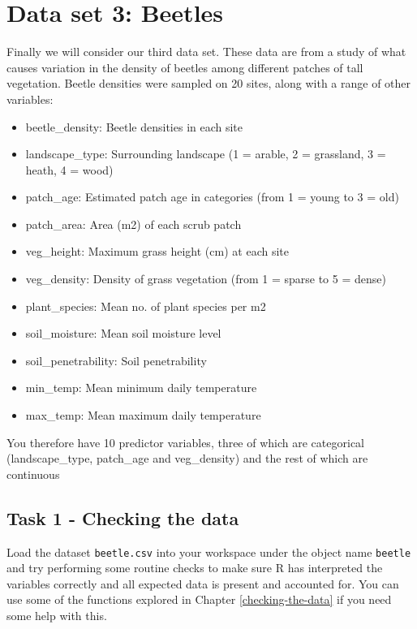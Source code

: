 \documentclass[
]{book}
\providecommand{\tightlist}{%
  \setlength{\itemsep}{0pt}\setlength{\parskip}{0pt}}
\begin{document}
\section{Data set 3: Beetles}\label{data-set-3-beetles}

Finally we will consider our third data set. These data are from a study of what causes variation in the density of beetles among different patches of tall vegetation. Beetle densities were sampled on 20 sites, along with a range of other variables:

\begin{itemize}
\tightlist
\item
  beetle\_density: Beetle densities in each site
\item
  landscape\_type: Surrounding landscape (1 = arable, 2 = grassland, 3 = heath, 4 = wood)
\item
  patch\_age: Estimated patch age in categories (from 1 = young to 3 = old)
\item
  patch\_area: Area (m2) of each scrub patch
\item
  veg\_height: Maximum grass height (cm) at each site
\item
  veg\_density: Density of grass vegetation (from 1 = sparse to 5 = dense)
\item
  plant\_species: Mean no. of plant species per m2
\item
  soil\_moisture: Mean soil moisture level
\item
  soil\_penetrability: Soil penetrability
\item
  min\_temp: Mean minimum daily temperature
\item
  max\_temp: Mean maximum daily temperature
\end{itemize}

You therefore have 10 predictor variables, three of which are categorical (landscape\_type, patch\_age and veg\_density) and the rest of which are continuous

\subsection{Task 1 - Checking the data}\label{c11t1}

Load the dataset \texttt{beetle.csv} into your workspace under the object name \texttt{beetle} and try performing some routine checks to make sure R has interpreted the variables correctly and all expected data is present and accounted for. You can use some of the functions explored in Chapter \ref{checking-the-data} if you need some help with this.
\end{document}

